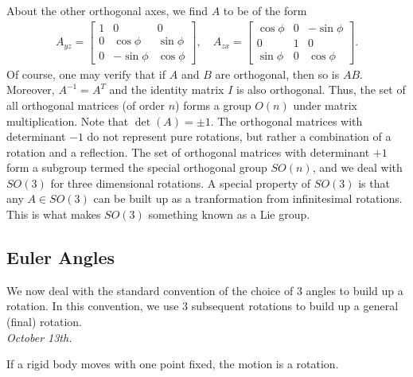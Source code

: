 About the other orthogonal axes, we find $A$ to be of the form
\begin{align}
    A_{yz} = \begin{bmatrix}
        1 & 0 & 0 \\
        0 & \cos \phi & \sin \phi \\
        0 & -\sin \phi & \cos \phi
    \end{bmatrix},\quad A_{zx} = \begin{bmatrix}
        \cos \phi & 0 & -\sin \phi \\
        0 & 1 & 0 \\
        \sin \phi & 0 & \cos \phi
    \end{bmatrix}.
\end{align}
Of course, one may verify that if $A$ and $B$ are orthogonal, then so is $AB$. Moreover, $A^{-1} = A^{T}$ and the identity matrix $I$ is also orthogonal. Thus, the set of all orthogonal matrices (of order $n$) forms a group $O(n)$ under matrix multiplication. Note that $\det(A) = \pm 1$. The orthogonal matrices with determinant $-1$ do not represent pure rotations, but rather a combination of a rotation and a reflection. The set of orthogonal matrices with determinant $+1$ form a subgroup termed the special orthogonal group $SO(n)$, and we deal with $SO(3)$ for three dimensional rotations. A special property of $SO(3)$ is that any $A \in SO(3)$ can be built up as a tranformation from infinitesimal rotations. This is what makes $SO(3)$ something known as a Lie group.

\subsection{Euler Angles}

We now deal with the standard convention of the choice of 3 angles to build up a rotation. In this convention, we use 3 subsequent rotations to build up a general (final) rotation.\\

\textit{October 13th.}
\begin{theorem}
    If a rigid body moves with one point fixed, the motion is a rotation.
\end{theorem}

